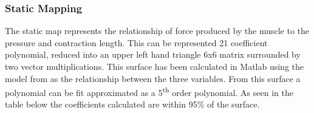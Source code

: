 \documentclass[11pt,a4paper]{article}
\begin{document}
\subsubsection{Static Mapping}
\label{sub:static_mapping}
The static map represents the relationship of force produced by the muscle to the pressure and contraction length. This can be represented  21 coefficient polynomial, reduced into an upper left hand triangle 6x6 matrix surrounded by two vector multiplications. This surface has been calculated in Matlab using the model from \cite{martens_boblan_2017} as the relationship between the three variables. From this surface a polynomial can be fit approximated as a 5\textsuperscript{th} order polynomial. As seen in the table below  the coefficients calculated are within 95\% of the surface.
\end{document}
